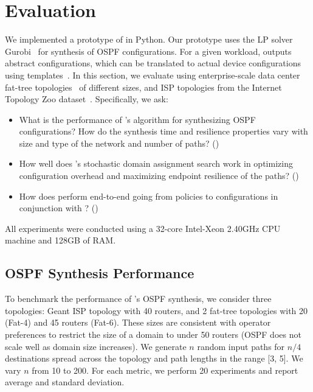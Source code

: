 \section{Evaluation}
 \label{sec:evaluation}
 
 We implemented a prototype of \name in Python. Our prototype uses the
 LP solver Gurobi~\cite{gurobi} for synthesis of OSPF configurations.
 For a given workload, \name outputs abstract configurations, which
 can be translated to actual device configurations using
 templates~\cite{template}.  In this section, we evaluate \Name using
enterprise-scale data
center fat-tree topologies~\cite{fattree} of different 
sizes, and ISP topologies from the Internet Topology Zoo 
dataset~\cite{zoo}.  
Specifically, we ask:
\begin{itemize}
	\item What is the performance of \Name's algorithm for
          synthesizing OSPF configurations? How do the synthesis time
          and resilience properties vary with size and type of the
          network and number of paths? ()
	
	\item How well does \name's stochastic domain assignment 
	search work in optimizing configuration overhead
	and maximizing endpoint resilience of the paths? ()
	
	\item How does \name perform end-to-end going from policies to
          configurations in conjunction with \genesis?
          ()
\end{itemize}
All experiments were conducted using a
32-core Intel-Xeon 2.40GHz CPU machine and
128GB of RAM.

\subsection{OSPF Synthesis Performance}\label{sec:ospfeval}
To benchmark the performance of \name's OSPF synthesis,
we consider three topologies: Geant ISP topology with 40 routers,
and 2 fat-tree topologies with 20 (Fat-4) and 45 routers (Fat-6). 
These sizes are consistent with operator preferences to restrict
the size of a domain to under 50 routers (OSPF does not scale
well as domain size increases). We generate $n$ random input paths for
$n/4$ destinations spread across the topology and path
lengths in the range [3, 5]. We vary $n$ from 10 to 200. For each metric, we perform 20 experiments
and report average and standard deviation. 

